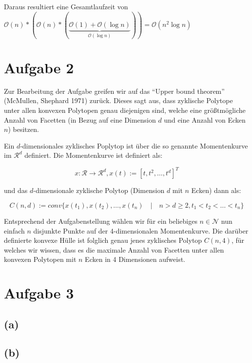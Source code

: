 \documentclass[a4paper]{article}
\begin{document}
 Daraus resultiert eine Gesamtlaufzeit von $\mathcal{O}(n) * (\mathcal{O}(n) * (\underbrace{\mathcal{O}(1) + \mathcal{O}(\log n)}_{\mathcal{O}(\log n)})) = \mathcal{O}(n^2 \log n)$



\section*{Aufgabe 2}

Zur Bearbeitung der Aufgabe greifen wir auf das "`Upper bound theorem"' (McMullen, Shephard 1971) zurück.
Dieses sagt aus, dass zyklische Polytope unter allen konvexen Polytopen genau diejenigen sind, welche eine größtmögliche Anzahl von Facetten (in Bezug auf eine Dimension $d$ und eine Anzahl von
Ecken $n$) besitzen.

Ein $d$-dimensionales zyklisches Poplytop ist über die so genannte Momentenkurve im $\mathcal{R}^d$ definiert. Die Momentenkurve ist definiert als:

$$x: \mathcal{R} \rightarrow \mathcal{R}^d, x(t) := [t, t^2, \dots, t^d]^T$$

und das $d$-dimensionale zyklische Polytop (Dimension $d$ mit $n$ Ecken) dann als:

$$C(n,d) := conv\{x(t_1), x(t_2), \dots, x(t_n) \quad|\quad n > d \geq 2, t_1 < t_2 < \dots < t_n\}$$

Entsprechend der Aufgabenstellung wählen wir für ein beliebiges $n \in \mathcal{N}$ nun
einfach $n$ disjunkte Punkte auf der 4-dimensionalen Momentenkurve. 
Die darüber definierte konvexe Hülle ist folglich genau jenes zyklisches Polytop $C(n,4)$, 
für welches wir wissen, dass es die maximale Anzahl von Facetten unter allen konvexen Polytopen
mit $n$ Ecken in 4 Dimensionen aufweist. 


\section*{Aufgabe 3}
\subsection*{(a)}
\subsection*{(b)}
\end{document}
